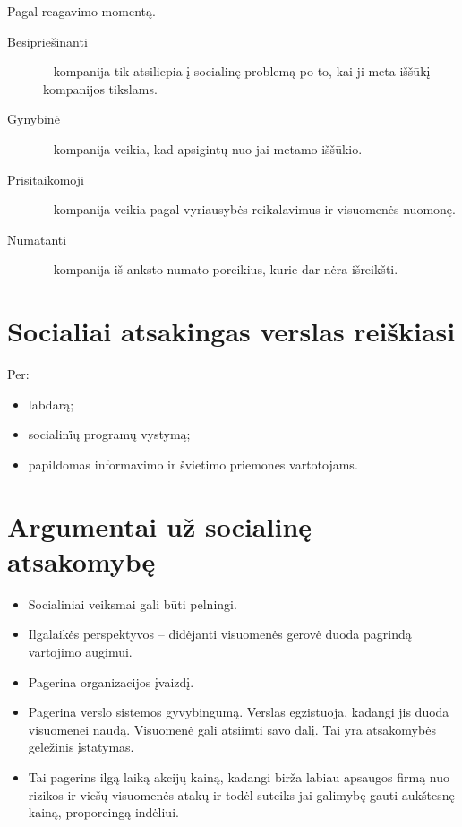 Pagal reagavimo momentą.

\begin{description}
  \item[Besipriešinanti] – kompanija tik atsiliepia į socialinę problemą
    po to, kai ji meta iššūkį kompanijos tikslams.
  \item[Gynybinė] – kompanija veikia, kad apsigintų nuo jai metamo
    iššūkio.
  \item[Prisitaikomoji] – kompanija veikia pagal vyriausybės reikalavimus
    ir visuomenės nuomonę.
  \item[Numatanti] – kompanija iš anksto numato poreikius, kurie dar nėra
    išreikšti.
\end{description}

\section{Socialiai atsakingas verslas reiškiasi}

Per:
\begin{itemize}
  \item labdarą;
  \item socialini̇ų programų vystymą;
  \item papildomas informavimo ir švietimo priemones vartotojams.
\end{itemize}

\section{Argumentai už socialinę atsakomybę}

\begin{itemize}
  \item Socialiniai veiksmai gali būti pelningi.
  \item Ilgalaikės perspektyvos – didėjanti visuomenės gerovė duoda
    pagrindą vartojimo augimui.
  \item Pagerina organizacijos įvaizdį.
  \item Pagerina verslo sistemos gyvybingumą. Verslas egzistuoja,
    kadangi jis duoda visuomenei naudą. Visuomenė gali atsiimti savo
    dalį. Tai yra atsakomybės geležinis įstatymas.
  \item Tai pagerins ilgą laiką akcijų kainą, kadangi birža labiau
    apsaugos firmą nuo rizikos ir viešų visuomenės atakų ir todėl
    suteiks jai galimybę gauti aukštesnę kainą, proporcingą indėliui.
\end{itemize}

